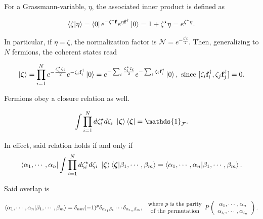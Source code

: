 \documentclass{homework}
\begin{document}
For a Grassmann-variable, $\eta$, the associated inner product is defined as 

\begin{equation}\begin{split}
    \bra{\zeta} \ket{\eta} = \bra{0} e^{-\zeta^\star {\bf f}} e^{{\eta} {\bf f}^\dagger}\ket{0} = 1 + \zeta^\star\eta = e^{\zeta^\star\eta}.
\end{split}
\end{equation}
    
In particular, if $\eta = \zeta$, the normalization factor is $\mathcal{N} = e^{-\frac{\zeta^\star\zeta}{2}}$. Then, generalizing to $N$ fermions, the coherent states read

$$
    \ket{{\bm \zeta}} = \prod_{i=1}^{N} e^{-\frac{\zeta^\star_i\zeta_i}{2}} e^{-\zeta_i {\bf f}_i^\dagger} \ket{0} = e^{-\sum_{i} \frac{\zeta^\star_i\zeta_i}{2}} e^{-\sum_{i} \zeta_i {\bf f}_i^\dagger} \ket{0}, \textnormal{ since } [\zeta_i {\bf f}_i^\dagger, \zeta_j {\bf f}_j^\dagger] = 0.
$$

Fermions obey a closure relation as well. 

\begin{equation}
    \begin{split}
        \int \prod_{i=1}^{N} d\zeta^\star_i d\zeta_i \blanky \ket{\bm{\zeta}}\bra{\bm{\zeta}} = \mathds{1}_{\mathcal{F}}.
    \end{split}
\end{equation}

\begin{tcolorbox}[title = Fermionic closure relation]
In effect, said relation holds if and only if 
    $$
    \bra{\alpha_1, \cdots, \alpha_n} \int \prod_{i=1}^{N} d\zeta^\star_i d\zeta_i \textnormal{ } \ket{\bm{\zeta}}\bra{\bm{\zeta}} \ket{\beta_1, \cdots, \beta_m} = \bra{\alpha_1, \cdots, \alpha_n} \ket{\beta_1, \cdots, \beta_m}.
    $$

Said overlap is 

$$
     \bra{\alpha_1, \cdots, \alpha_n}\ket{\beta_1, \cdots, \beta_m} = \delta_{nm} (-1)^p \delta_{\alpha_{i_1} \beta_1} \cdots \delta_{\alpha_{i_n} \beta_m}, \begin{array}{c}
          \textnormal{ where $p$ is the parity} \\
          \textnormal{ of the permutation}
     \end{array} P\left(\begin{array}{cc}
          \alpha_1, \cdots, \alpha_n  \\
          \alpha_{i_i}, \cdots, \alpha_{i_n}
     \end{array}\right).
$$
\end{tcolorbox}
\end{document}
